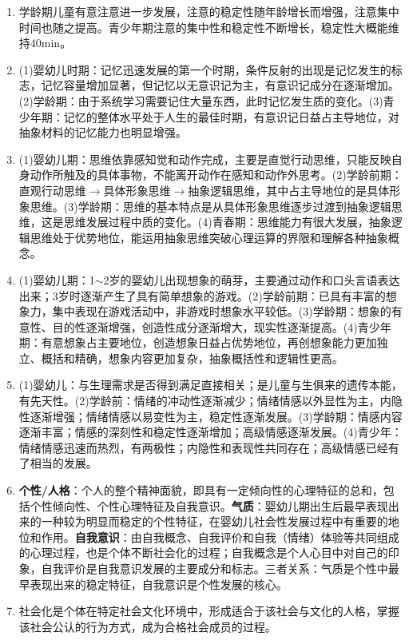 \begin{enumerate}[leftmargin=*, itemsep=5pt]
    \item 学龄期儿童有意注意进一步发展，注意的稳定性随年龄增长而增强，注意集中时间也随之提高。青少年期注意的集中性和稳定性不断增长，稳定性大概能维持40min。

    \item (1)婴幼儿时期：记忆迅速发展的第一个时期，条件反射的出现是记忆发生的标志，记忆容量增加显著，但记忆以无意识记为主，有意识记成分在逐渐增加。(2)学龄期：由于系统学习需要记住大量东西，此时记忆发生质的变化。(3)青少年期：记忆的整体水平处于人生的最佳时期，有意识记日益占主导地位，对抽象材料的记忆能力也明显增强。

    \item (1)婴幼儿期：思维依靠感知觉和动作完成，主要是直觉行动思维，只能反映自身动作所触及的具体事物，不能离开动作在感知和动作外思考。(2)学龄前期：直观行动思维$\to$具体形象思维$\to$抽象逻辑思维，其中占主导地位的是具体形象思维。(3)学龄期：思维的基本特点是从具体形象思维逐步过渡到抽象逻辑思维，这是思维发展过程中质的变化。(4)青春期：思维能力有很大发展，抽象逻辑思维处于优势地位，能运用抽象思维突破心理运算的界限和理解各种抽象概念。

    \item (1)婴幼儿期：1$\sim$2岁的婴幼儿出现想象的萌芽，主要通过动作和口头言语表达出来；3岁时逐渐产生了具有简单想象的游戏。(2)学龄前期：已具有丰富的想象力，集中表现在游戏活动中，非游戏时想象水平较低。(3)学龄期：想象的有意性、目的性逐渐增强，创造性成分逐渐增大，现实性逐渐提高。(4)青少年期：有意想象占主要地位，创造想象日益占优势地位，再创想象能力更加独立、概括和精确，想象内容更加复杂，抽象概括性和逻辑性更高。

    \item (1)婴幼儿：与生理需求是否得到满足直接相关；是儿童与生俱来的遗传本能，有先天性。(2)学龄前：情绪的冲动性逐渐减少；情绪情感以外显性为主，内隐性逐渐增强；情绪情感以易变性为主，稳定性逐渐发展。(3)学龄期：情感内容逐渐丰富；情感的深刻性和稳定性逐渐增加；高级情感逐渐发展。(4)青少年：情绪情感迅速而热烈，有两极性；内隐性和表现性共同存在；高级情感已经有了相当的发展。

    \item \textbf{个性/人格}：个人的整个精神面貌，即具有一定倾向性的心理特征的总和，包括个性倾向性、个性心理特征及自我意识。\textbf{气质}：婴幼儿期出生后最早表现出来的一种较为明显而稳定的个性特征，在婴幼儿社会性发展过程中有重要的地位和作用。\textbf{自我意识}：由自我概念、自我评价和自我（情绪）体验等共同组成的心理过程，也是个体不断社会化的过程；自我概念是个人心目中对自己的印象，自我评价是自我意识发展的主要成分和标志。三者关系：气质是个性中最早表现出来的稳定特征，自我意识是个性发展的核心。

    \item 社会化是个体在特定社会文化环境中，形成适合于该社会与文化的人格，掌握该社会公认的行为方式，成为合格社会成员的过程。
\end{enumerate}

\newpage
